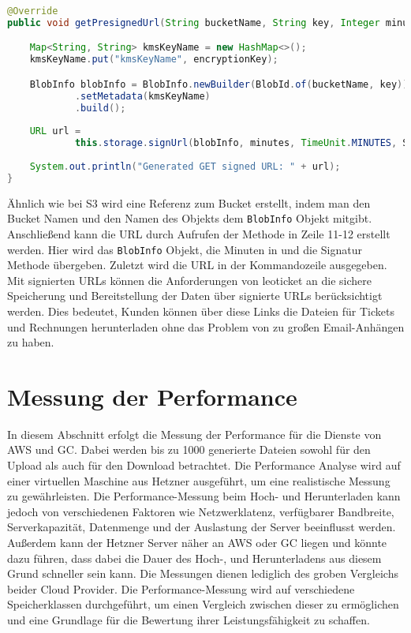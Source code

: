 \begin{lstlisting}[language=Java, caption=Prototyp Code Snippet - Generierung eines signierten URLs durch GC]
@Override
public void getPresignedUrl(String bucketName, String key, Integer minutes, String encryptionKey) {

    Map<String, String> kmsKeyName = new HashMap<>();
    kmsKeyName.put("kmsKeyName", encryptionKey);

    BlobInfo blobInfo = BlobInfo.newBuilder(BlobId.of(bucketName, key))
            .setMetadata(kmsKeyName)
            .build();
    
    URL url =
            this.storage.signUrl(blobInfo, minutes, TimeUnit.MINUTES, Storage.SignUrlOption.withV4Signature());
    
    System.out.println("Generated GET signed URL: " + url);
}
\end{lstlisting}

Ähnlich wie bei S3 wird eine Referenz zum Bucket erstellt, indem man den Bucket Namen und den Namen des Objekts dem \verb|BlobInfo| Objekt mitgibt. Anschließend kann die URL durch Aufrufen der Methode in Zeile 11-12 erstellt werden. Hier wird das \verb|BlobInfo| Objekt, die Minuten in und die Signatur Methode übergeben. Zuletzt wird die URL in der Kommandozeile ausgegeben.\\

Mit signierten URLs können die Anforderungen von leoticket an die sichere Speicherung und Bereitstellung der Daten über signierte URLs berücksichtigt werden. Dies bedeutet, Kunden können über diese Links die Dateien für Tickets und Rechnungen herunterladen ohne das Problem von zu großen Email-Anhängen zu haben.\\

\newpage

\section{Messung der Performance}

In diesem Abschnitt erfolgt die Messung der Performance für die Dienste von AWS und GC. Dabei werden bis zu 1000 generierte Dateien sowohl für den Upload als auch für den Download betrachtet. Die Performance Analyse wird auf einer virtuellen Maschine aus Hetzner ausgeführt, um eine realistische Messung zu gewährleisten. Die Performance-Messung beim Hoch- und Herunterladen kann jedoch von verschiedenen Faktoren wie Netzwerklatenz, verfügbarer Bandbreite, Serverkapazität, Datenmenge und der Auslastung der Server beeinflusst werden. Außerdem kann der Hetzner Server näher an AWS oder GC liegen und könnte dazu führen, dass dabei die Dauer des Hoch-, und Herunterladens aus diesem Grund schneller sein kann. Die Messungen dienen lediglich des groben Vergleichs beider Cloud Provider. Die Performance-Messung wird auf verschiedene Speicherklassen durchgeführt, um einen Vergleich zwischen dieser zu ermöglichen und eine Grundlage für die Bewertung ihrer Leistungsfähigkeit zu schaffen.\\

